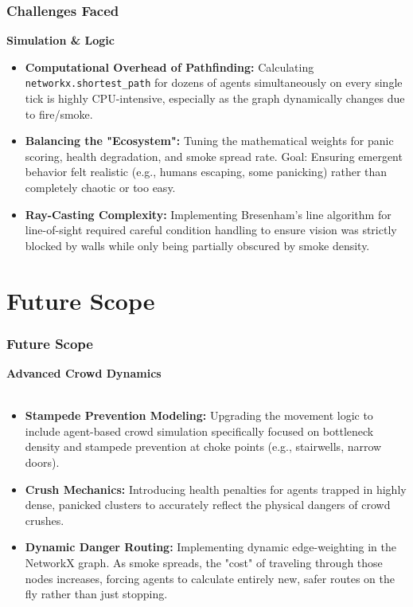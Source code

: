 \documentclass{beamer}
\begin{document}
\begin{frame}
\frametitle{Challenges Faced}
\textbf{Simulation \& Logic} 
\footnotesize 

\begin{itemize}
    \item \textbf{Computational Overhead of Pathfinding:} Calculating \texttt{networkx.shortest\_path} for dozens of agents simultaneously on every single tick is highly CPU-intensive, especially as the graph dynamically changes due to fire/smoke.
    \item \textbf{Balancing the "Ecosystem":} Tuning the mathematical weights for panic scoring, health degradation, and smoke spread rate. Goal: Ensuring emergent behavior felt realistic (e.g., humans escaping, some panicking) rather than completely chaotic or too easy.
    \item \textbf{Ray-Casting Complexity:} Implementing Bresenham's line algorithm for line-of-sight required careful condition handling to ensure vision was strictly blocked by walls while only being partially obscured by smoke density.
\end{itemize}
\end{frame}

\section{Future Scope}

\begin{frame}
\frametitle{Future Scope}
\textbf{Advanced Crowd Dynamics} \\
\vspace{0.2cm}
\footnotesize 

\begin{itemize}
    \item \textbf{Stampede Prevention Modeling:} Upgrading the movement logic to include agent-based crowd simulation specifically focused on bottleneck density and stampede prevention at choke points (e.g., stairwells, narrow doors).
    \item \textbf{Crush Mechanics:} Introducing health penalties for agents trapped in highly dense, panicked clusters to accurately reflect the physical dangers of crowd crushes.
    \item \textbf{Dynamic Danger Routing:} Implementing dynamic edge-weighting in the NetworkX graph. As smoke spreads, the "cost" of traveling through those nodes increases, forcing agents to calculate entirely new, safer routes on the fly rather than just stopping.
\end{itemize}
\end{frame}
\end{document}
